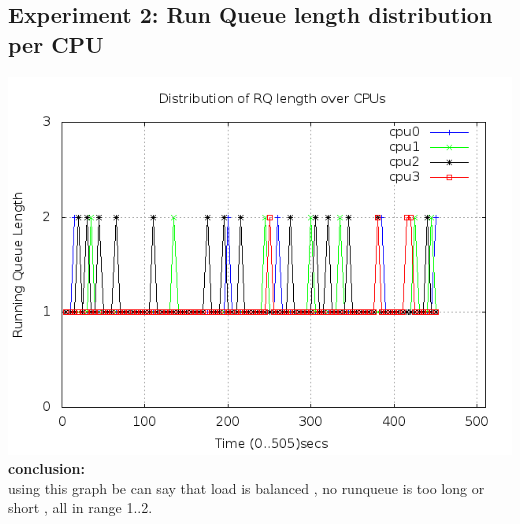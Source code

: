\documentclass[a4paper,11pt]{report}
\begin{document}
 \subsection{Experiment 2: Run Queue length distribution per CPU}
 \includegraphics[scale=0.5]{rqlength.png}\\
 {\bf conclusion:} \\using this graph be can say that load is balanced , no runqueue is too long or short , all in range 1..2.
\end{document}
